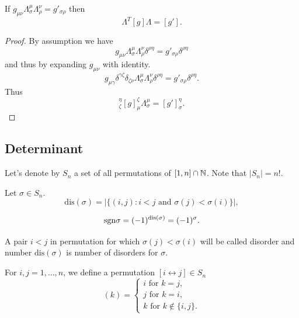 \documentclass[main.tex]{subfiles}
\begin{document}
\begin{theorem}
\label{skewed-lorentz}
If $g_{\mu\nu} \Lambda^\mu_\sigma \Lambda^\nu_\rho = g'_{\sigma\rho}$ then
\begin{equation}
\Lambda^T [g] \Lambda = [g'].
\end{equation}
\end{theorem}
\begin{proof}
By assumption we have
\begin{equation}
g_{\mu\nu} \Lambda^\mu_\sigma \Lambda^\nu_\rho \delta^{\rho \eta} = g'_{\sigma\rho} \delta^{\rho \eta} 
\end{equation}
and thus by expanding $g_{\mu\nu}$ with identity.
\begin{equation}
g_{\mu\gamma}\delta^{\gamma\zeta}\delta_{\zeta \nu} \Lambda^\mu_\sigma \Lambda^\nu_\rho \delta^{\rho \eta} = g'_{\sigma\rho} \delta^{\rho \eta}.
\end{equation}
Thus
\begin{equation}
[\Lambda^T]^\eta_\zeta [g]_\mu^\zeta \Lambda^\mu_\sigma  = [g']_\sigma^\eta.
\end{equation}
\end{proof}

\subsection{Determinant}

Let's denote by $S_n$ a set of all permutations of $[1, n]\cap\mathbb{N}$. Note that $|S_n| = n!$.
\begin{definition}
Let $\sigma\in S_n$.
\begin{equation}
\text{dis}(\sigma) = {|\{(i,j): i < j \text{ and }\sigma(j) < \sigma(i)\}|},
\end{equation}

\begin{equation}
\text{sgn}\sigma = (-1)^{\text{dis}(\sigma)} = (-1)^\sigma.
\end{equation}

\end{definition}

A pair $i < j$ in permutation for which $\sigma(j) < \sigma(i)$ will be called disorder and number $\text{dis}(\sigma)$ is number of disorders for $\sigma$. 
\begin{definition}
For $i, j = 1, \dots, n$, we define a permutation $[i\leftrightarrow j]\in S_n$
\begin{equation}
[i\leftrightarrow j](k) = 
\begin{cases}
i \text{ for } k = j,\\
j \text{ for } k = i,\\
k \text{ for } k\not\in\{i,j\}.
\end{cases} 
\end{equation}
\end{definition}  
\end{document}
